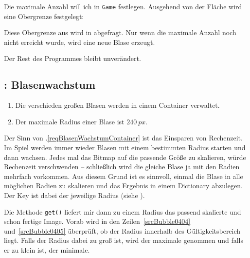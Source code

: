 Die maximale Anzahl will ich in \texttt{Game} festlegen. Ausgehend von der Fläche wird eine Obergrenze festgelegt:


Diese Obergrenze aus  wird in  abgefragt. Nur wenn die maximale Anzahl noch nicht erreicht wurde, wird eine neue Blase erzeugt.


Der Rest des Programmes bleibt unverändert.

\subsection{: Blasenwachstum}
	\begin{enumerate}
		\item Die verschieden großen Blasen werden in einem Container verwaltet.\label{reqBlasenWachstumContainer}
		
		\item Der maximale Radius einer Blase ist $240~px$.\label{reqBlasenWachstumMax}
	\end{enumerate}
\er

Der Sinn von .\ref{reqBlasenWachstumContainer} ist das Einsparen von Rechenzeit. Im Spiel werden immer wieder Blasen mit einem bestimmten Radius starten und dann wachsen. Jedes mal das Bitmap auf die passende Größe zu skalieren, würde Rechenzeit verschwenden -- schließlich wird die gleiche Blase ja mit den Radien mehrfach vorkommen. Aus diesem Grund ist es sinnvoll, einmal die Blase in alle möglichen Radien zu skalieren und das Ergebnis in einem Dictionary abzulegen. Der Key ist dabei der jeweilige Radius (siehe ).

Die Methode \texttt{get()} liefert mir dann zu einem Radius das passend skalierte und schon fertige Image. Vorab wird in den Zeilen~\ref{srcBubble0404} und~\ref{srcBubble0405} überprüft, ob der Radius innerhalb des Gültigkeitsbereich liegt. Falls der Radius dabei zu groß ist, wird der maximale genommen und falls er zu klein ist, der minimale.

